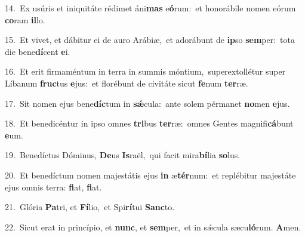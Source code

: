 {\numbfont\textcolor{\numbcolor}{14.}}~Ex usúris et iniquitáte rédimet áni\textbf{mas} e\-\textbf{ó}\-rum:~\star et honorábile nomen eórum \textbf{co}\-ram \textbf{il}\-lo.\par
{\numbfont\textcolor{\numbcolor}{15.}}~Et vivet, et dábitur ei de auro Arábiæ,~\dagger et adorábunt de \textbf{ip}\-so \textbf{sem}\-per:~\star tota die bene\-\textbf{dí}\-cent \textbf{e}\-i.\par
{\numbfont\textcolor{\numbcolor}{16.}}~Et erit firmaméntum in terra in summis móntium,~\dagger superextollétur super Líbanum \textbf{fruc}\-tus \textbf{e}\-jus:~\star et florébunt de civitáte sicut \textbf{fe}\-num \textbf{ter}\-ræ.\par
{\numbfont\textcolor{\numbcolor}{17.}}~Sit nomen ejus bene\-\textbf{díc}\-tum in \textbf{sǽ}\-cula:~\star ante solem pérmanet \textbf{no}\-men \textbf{e}\-jus.\par
{\numbfont\textcolor{\numbcolor}{18.}}~Et benedicéntur in ipso omnes \textbf{tri}\-bus \textbf{ter}\-ræ:~\star omnes Gentes magnifi\-\textbf{cá}\-bunt \textbf{e}\-um.\par
{\numbfont\textcolor{\numbcolor}{19.}}~Benedíctus Dóminus, \textbf{De}\-us \textbf{Is}\-raël,~\star qui facit mira\-\textbf{bí}\-lia \textbf{so}\-lus.\par
{\numbfont\textcolor{\numbcolor}{20.}}~Et benedíctum nomen majestátis ejus \textbf{in} æ\-\textbf{tér}\-num:~\star et replébitur majestáte ejus omnis terra: \textbf{fi}\-at, \textbf{fi}\-at.\par
{\numbfont\textcolor{\numbcolor}{21.}}~Glória \textbf{Pa}\-tri, et \textbf{Fí}\-lio,~\star et Spi\-\textbf{rí}\-tui \textbf{Sanc}\-to.\par
{\numbfont\textcolor{\numbcolor}{22.}}~Sicut erat in princípio, et \textbf{nunc}\-, et \textbf{sem}\-per,~\star et in sǽcula sæcu\-\textbf{ló}\-rum. \textbf{A}\-men.\par
